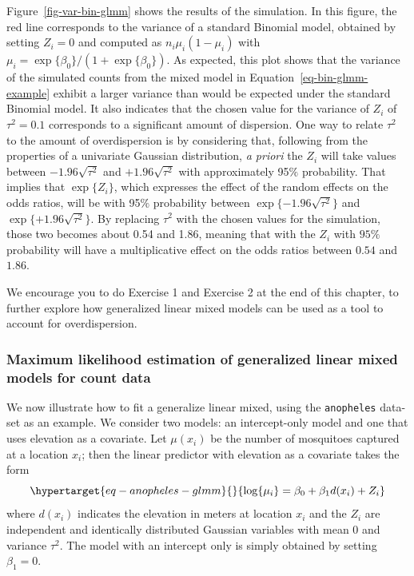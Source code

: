 \documentclass[
  letterpaper,
]{krantz}
\begin{document}
Figure~\ref{fig-var-bin-glmm} shows the results of the simulation. In
this figure, the red line corresponds to the variance of a standard
Binomial model, obtained by setting \(Z_i=0\) and computed as
\(n_i \mu_i (1-\mu_i)\) with
\(\mu_i = \exp\{\beta_0\}/(1+\exp\{\beta_0\})\). As expected, this plot
shows that the variance of the simulated counts from the mixed model in
Equation~\ref{eq-bin-glmm-example} exhibit a larger variance than would
be expected under the standard Binomial model. It also indicates that
the chosen value for the variance of \(Z_i\) of \(\tau^2 = 0.1\)
corresponds to a significant amount of dispersion. One way to relate
\(\tau^2\) to the amount of overdispersion is by considering that,
following from the properties of a univariate Gaussian distribution,
\emph{a priori} the \(Z_i\) will take values between
\(-1.96 \sqrt{\tau^2}\) and \(+1.96 \sqrt{\tau^2}\) with approximately
95\(\%\) probability. That implies that \(\exp\{Z_i\}\), which expresses
the effect of the random effects on the odds ratios, will be with
95\(\%\) probability between \(\exp\{-1.96 \sqrt{\tau^2}\}\) and
\(\exp\{+1.96 \sqrt{\tau^2}\}\). By replacing \(\tau^2\) with the chosen
values for the simulation, those two becomes about 0.54 and 1.86,
meaning that with the \(Z_i\) with \(95\%\) probability will have a
multiplicative effect on the odds ratios between \(0.54\) and \(1.86\).

We encourage you to do Exercise 1 and Exercise 2 at the end of this
chapter, to further explore how generalized linear mixed models can be
used as a tool to account for overdispersion.

\hypertarget{maximum-likelihood-estimation-of-generalized-linear-mixed-models-for-count-data}{%
\subsubsection{Maximum likelihood estimation of generalized linear mixed
models for count
data}\label{maximum-likelihood-estimation-of-generalized-linear-mixed-models-for-count-data}}

We now illustrate how to fit a generalize linear mixed, using the
\texttt{anopheles} data-set as an example. We consider two models: an
intercept-only model and one that uses elevation as a covariate. Let
\(\mu(x_i)\) be the number of mosquitoes captured at a location \(x_i\);
then the linear predictor with elevation as a covariate takes the form
\begin{equation}\protect\hypertarget{eq-anopheles-glmm}{}{
\log\{\mu_i\} = \beta_{0} + \beta_{1} d(x_i) + Z_i
}\label{eq-anopheles-glmm}\end{equation} where \(d(x_i)\) indicates the
elevation in meters at location \(x_i\) and the \(Z_i\) are independent
and identically distributed Gaussian variables with mean 0 and variance
\(\tau^2\). The model with an intercept only is simply obtained by
setting \(\beta_1 = 0\).
\end{document}
